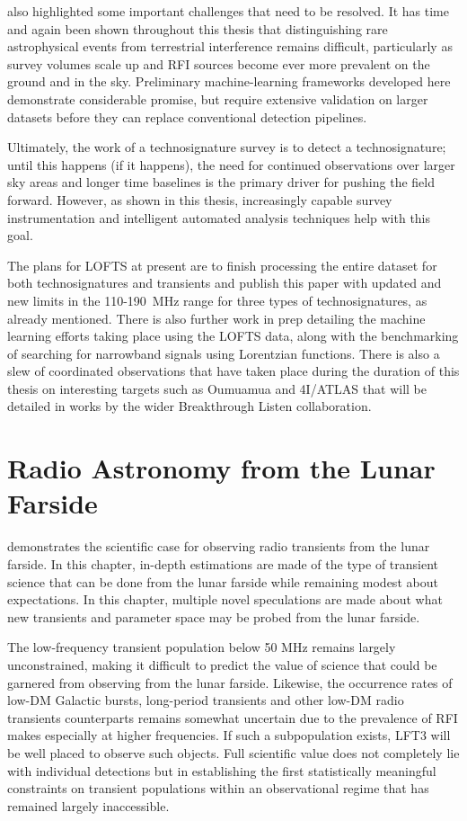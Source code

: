  also highlighted some important challenges that need to be resolved. It has time and again been shown throughout this thesis that distinguishing rare astrophysical events from terrestrial interference remains difficult, particularly as survey volumes scale up and RFI sources become ever more prevalent on the ground and in the sky. Preliminary machine-learning frameworks developed here demonstrate considerable promise, but require extensive validation on larger datasets before they can replace conventional detection pipelines.

Ultimately, the work of a technosignature survey is to detect a technosignature; until this happens (if it happens), the need for continued observations over larger sky areas and longer time baselines is the primary driver for pushing the field forward. However, as shown in this thesis, increasingly capable survey instrumentation and intelligent automated analysis techniques help with this goal. 

The plans for LOFTS at present are to finish processing the entire dataset for both technosignatures and transients and publish this paper with updated and new limits in the 110-190~MHz range for three types of technosignatures, as already mentioned. There is also further work in prep detailing the machine learning efforts taking place using the LOFTS data, along with the benchmarking of searching for narrowband signals using Lorentzian functions. There is also a slew of coordinated observations that have taken place during the duration of this thesis on interesting targets such as Oumuamua and 4I/ATLAS that will be detailed in works by the wider Breakthrough Listen collaboration. 

\section{Radio Astronomy from the Lunar Farside}

 demonstrates the scientific case for observing radio transients from the lunar farside. In this chapter, in-depth estimations are made of the type of transient science that can be done from the lunar farside while remaining modest about expectations. In this chapter, multiple novel speculations are made about what new transients and parameter space may be probed from the lunar farside. 

The low-frequency transient population below 50 MHz remains largely unconstrained, making it difficult to predict the value of science that could be garnered from observing from the lunar farside. Likewise, the occurrence rates of low-DM Galactic bursts, long-period transients and other low-DM radio transients counterparts remains somewhat uncertain due to the prevalence of RFI makes especially at higher frequencies. If such a subpopulation exists, LFT3 will be well placed to observe such objects. Full scientific value does not completely lie with individual detections but in establishing the first statistically meaningful constraints on transient populations within an observational regime that has remained largely inaccessible.

